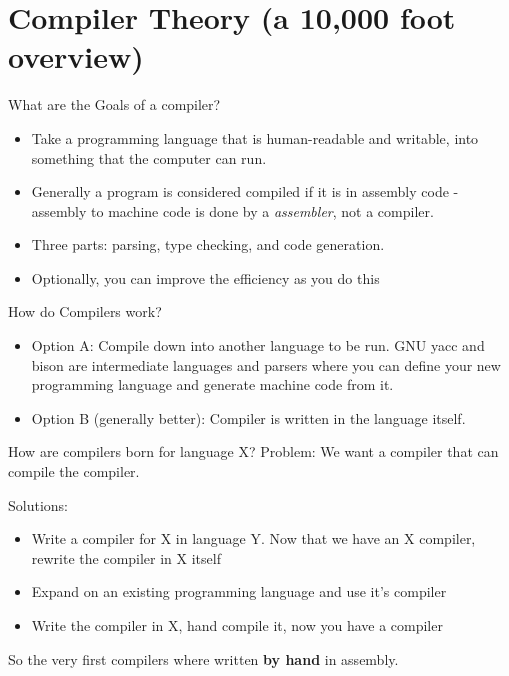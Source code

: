 \documentclass{beamer}
\begin{document}

\section{Compiler Theory (a 10,000 foot overview)}

\begin{frame}{What are the Goals of a compiler?}
  \begin{itemize}
    \item Take a programming language that is human-readable and
      writable, into something that the computer can run.
    \item Generally a program is considered compiled if it is in
      assembly code - assembly to machine code is done by a
      \textit{assembler}, not a compiler.
    \item Three parts: parsing, type checking, and code
      generation.
    \item Optionally, you can improve the efficiency as you do this
  \end{itemize}
\end{frame}

\begin{frame}{How do Compilers work?}
  \begin{itemize}
    \item Option A: Compile down into another
      language to be run. GNU yacc and bison are intermediate
      languages and parsers where you can define your new programming
      language and generate machine code from it.
    \item Option B (generally better): Compiler is written in the
      language itself.
  \end{itemize}
\end{frame}

\begin{frame}{How are compilers born for language X?}
  Problem: We want a compiler that can compile the compiler.

  Solutions:
  \begin{itemize}
    \item Write a compiler for X in language Y. Now that we have an X
      compiler, rewrite the compiler in X itself
    \item Expand on an existing programming language and use it's compiler
    \item Write the compiler in X, hand compile it, now you have a
      compiler
  \end{itemize}
  So the very first compilers where written \textbf{by hand} in
  assembly. 
\end{frame}
\end{document}
